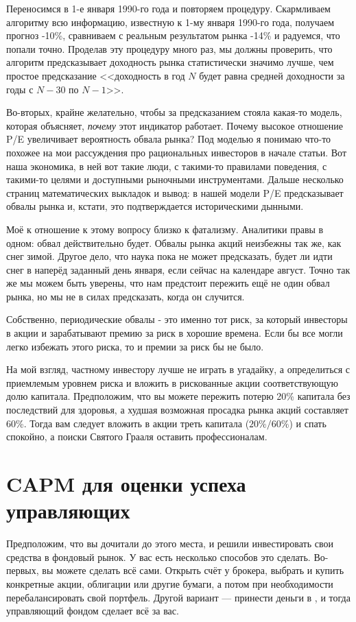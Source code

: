 Переносимся в 1-е января 1990-го года и повторяем процедуру. Скармливаем алгоритму всю информацию, известную к 1-му января 1990-го года, получаем прогноз -10\%, сравниваем с реальным результатом рынка -14\% и радуемся, что попали точно. Проделав эту процедуру много раз, мы должны проверить, что алгоритм предсказывает доходность рынка статистически значимо лучше, чем простое предсказание <<доходность в год $N$ будет равна средней доходности за годы с $N-30$ по $N-1$>>.

Во-вторых, крайне желательно, чтобы за предсказанием стояла какая-то модель, которая объясняет, \emph{почему} этот индикатор работает. Почему высокое отношение P/E увеличивает вероятность обвала рынка? Под моделью я понимаю что-то похожее на мои рассуждения про рациональных инвесторов в начале статьи. Вот наша экономика, в ней вот такие люди, с такими-то правилами поведения, с такими-то целями и доступными рыночными инструментами. Дальше несколько страниц математических выкладок и вывод: в нашей модели P/E предсказывает обвалы рынка и, кстати, это подтверждается историческими дынными.

Моё к отношение к этому вопросу близко к фатализму. Аналитики правы в одном: обвал действительно будет. Обвалы рынка акций неизбежны так же, как снег зимой. Другое дело, что наука пока не может предсказать, будет ли идти снег в наперёд заданный день января, если сейчас на календаре август. Точно так же мы можем быть уверены, что нам предстоит пережить ещё не один обвал рынка, но мы не в силах предсказать, когда он случится.

Собственно, периодические обвалы - это именно тот риск, за который инвесторы в акции и зарабатывают премию за риск в хорошие времена. Если бы все могли легко избежать этого риска, то и премии за риск бы не было.

На мой взгляд, частному инвестору лучше не играть в угадайку, а определиться с приемлемым уровнем риска и вложить в рискованные акции соответствующую долю капитала. Предположим, что вы можете пережить потерю 20\% капитала без последствий для здоровья, а худшая возможная просадка рынка акций составляет 60\%. Тогда вам следует вложить в акции треть капитала ($20\%/60\%$) и спать спокойно, а поиски Святого Грааля оставить профессионалам.

\section*{CAPM для оценки успеха управляющих}

Предположим, что вы дочитали до этого места, и решили инвестировать свои средства в фондовый рынок. У вас есть несколько способов это сделать. Во-первых, вы можете сделать всё сами. Открыть счёт у брокера, выбрать и купить конкретные акции, облигации или другие бумаги, а потом при необходимости перебалансировать свой портфель. Другой вариант --- принести деньги в , и тогда управляющий фондом сделает всё за вас.

